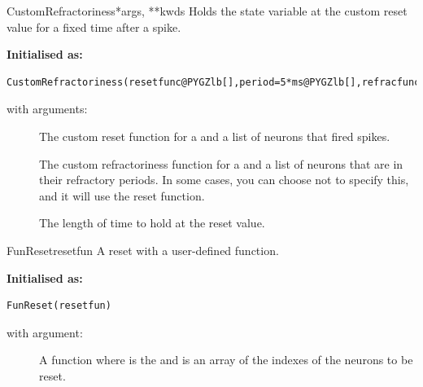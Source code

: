 \documentclass[letterpaper,10pt,english]{manual}
\begin{document}
\hypertarget{brian.CustomRefractoriness}{}\begin{classdesc}{CustomRefractoriness}{*args, **kwds}
Holds the state variable at the custom reset value for a fixed time after a spike.

\textbf{Initialised as:}

\begin{Verbatim}[commandchars=@\[\]]
CustomRefractoriness(resetfunc@PYGZlb[],period=5*ms@PYGZlb[],refracfunc=resetfunc@PYGZrb[]@PYGZrb[])
\end{Verbatim}

with arguments:
\begin{description}
\item[]
The custom reset function  for  a
\hyperlink{brian.NeuronGroup}{} and  a list of neurons that
fired spikes.

\item[]
The custom refractoriness function  for  a
\hyperlink{brian.NeuronGroup}{} and  a list of neurons that are in
their refractory periods. In some cases, you can choose not to specify this,
and it will use the reset function.

\item[]
The length of time to hold at the reset value.

\end{description}
\end{classdesc}

\hypertarget{brian.FunReset}{}\begin{classdesc}{FunReset}{resetfun}
A reset with a user-defined function.

\textbf{Initialised as:}

\begin{Verbatim}[commandchars=@\[\]]
FunReset(resetfun)
\end{Verbatim}

with argument:
\begin{description}
\item[]
A function  where  is the
\hyperlink{brian.NeuronGroup}{} and  is an array of
the indexes of the neurons to be reset.

\end{description}
\end{classdesc}
\end{document}
